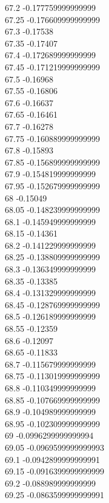 {67.2	-0.177759999999999\\
67.25	-0.176609999999999\\
67.3	-0.17538\\
67.35	-0.17407\\
67.4	-0.172689999999999\\
67.45	-0.171219999999999\\
67.5	-0.16968\\
67.55	-0.16806\\
67.6	-0.16637\\
67.65	-0.16461\\
67.7	-0.16278\\
67.75	-0.160889999999999\\
67.8	-0.15893\\
67.85	-0.156899999999999\\
67.9	-0.154819999999999\\
67.95	-0.152679999999999\\
68	-0.15049\\
68.05	-0.148239999999999\\
68.1	-0.145949999999999\\
68.15	-0.14361\\
68.2	-0.141229999999999\\
68.25	-0.138809999999999\\
68.3	-0.136349999999999\\
68.35	-0.13385\\
68.4	-0.131329999999999\\
68.45	-0.128769999999999\\
68.5	-0.126189999999999\\
68.55	-0.12359\\
68.6	-0.12097\\
68.65	-0.11833\\
68.7	-0.115679999999999\\
68.75	-0.113019999999999\\
68.8	-0.110349999999999\\
68.85	-0.107669999999999\\
68.9	-0.104989999999999\\
68.95	-0.102309999999999\\
69	-0.0996299999999994\\
69.05	-0.0969599999999993\\
69.1	-0.0942899999999991\\
69.15	-0.0916399999999999\\
69.2	-0.088989999999999\\
69.25	-0.0863599999999991\\
}
